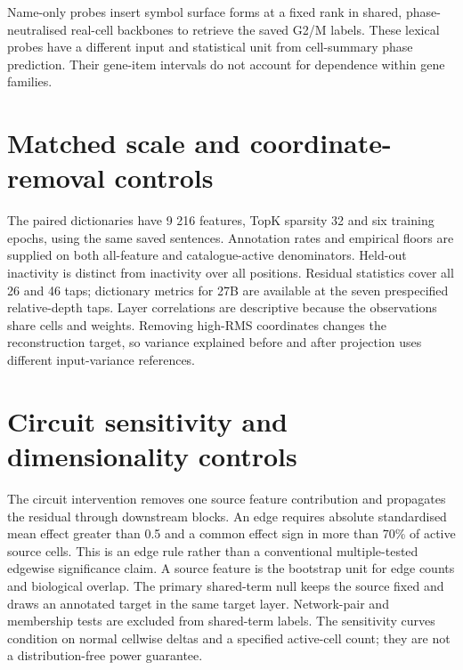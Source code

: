 \documentclass[11pt]{article}
\begin{document}


Name-only probes insert symbol surface forms at a fixed rank in shared, phase-neutralised real-cell
backbones to retrieve the saved G2/M labels. These lexical probes have a different input and
statistical unit from cell-summary phase prediction.
Their gene-item intervals do not account for dependence within gene families.



\section{Matched scale and coordinate-removal controls}

The paired dictionaries have 9 216 features, TopK sparsity 32 and six training epochs, using the
same saved sentences. Annotation rates and empirical floors are supplied on both all-feature and
catalogue-active denominators. Held-out inactivity is distinct from inactivity over all positions.
Residual statistics cover all 26 and 46 taps; dictionary metrics for 27B are available at the seven
prespecified relative-depth taps. Layer correlations are descriptive because the observations
share cells and weights. Removing high-RMS coordinates changes the reconstruction target, so
variance explained before and after projection uses different input-variance references.





\section{Circuit sensitivity and dimensionality controls}

The circuit intervention removes one source feature contribution and propagates the residual
through downstream blocks. An edge requires absolute standardised mean effect greater than 0.5
and a common effect sign in more than 70\% of active source cells. This is an edge rule rather
than a conventional multiple-tested edgewise significance claim. A source feature is the
bootstrap unit for edge counts and biological overlap. The primary shared-term null keeps the
source fixed and draws an annotated target in the same target layer. Network-pair and membership
tests are excluded from shared-term labels. The sensitivity curves condition on normal cellwise
deltas and a specified active-cell count; they are not a distribution-free power guarantee.
\end{document}
